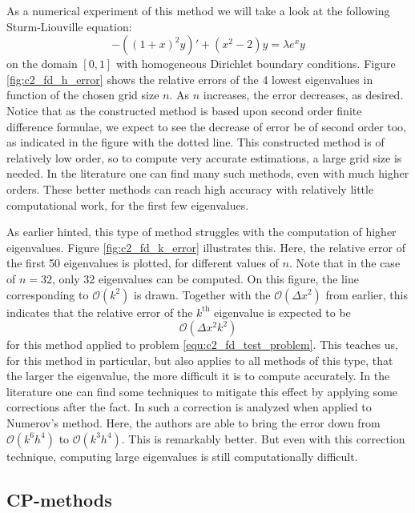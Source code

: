 As a numerical experiment of this method we will take a look at the following Sturm-Liouville equation:
\begin{equation}\label{equ:c2_fd_test_problem}
    -\left((1+x)^2 y \right)' + (x^2 - 2) y = \lambda e^x y
\end{equation}
on the domain $[0, 1]$ with homogeneous Dirichlet boundary conditions. Figure \ref{fig:c2_fd_h_error} shows the relative errors of the 4 lowest eigenvalues in function of the chosen grid size $n$. As $n$ increases, the error decreases, as desired. Notice that as the constructed method is based upon second order finite difference formulae, we expect to see the decrease of error be of second order too, as indicated in the figure with the dotted line. This constructed method is of relatively low order, so to compute very accurate estimations, a large grid size is needed. In the literature one can find many such methods, even with much higher orders. These better methods can reach high accuracy with relatively little computational work, for the first few eigenvalues.

As earlier hinted, this type of method struggles with the computation of higher eigenvalues. Figure \ref{fig:c2_fd_k_error} illustrates this. Here, the relative error of the first 50 eigenvalues is plotted, for different values of $n$. Note that in the case of $n = 32$, only $32$ eigenvalues can be computed. On this figure, the line corresponding to $\mathcal{O}(k^2)$ is drawn. Together with the $\mathcal{O}(\Delta x^2)$ from earlier, this indicates that the relative error of the $k^\text{th}$ eigenvalue is expected to be
$$
    \mathcal{O}(\Delta x^2 k^2)
$$
for this method applied to problem \eqref{equ:c2_fd_test_problem}. This teaches us, for this method in particular, but also applies to all methods of this type, that the larger the eigenvalue, the more difficult it is to compute accurately. In the literature one can find some techniques to mitigate this effect by applying some corrections after the fact. In \cite{andrew_correction_1985} such a correction is analyzed when applied to Numerov's method. Here, the authors are able to bring the error down from $\mathcal{O}(k^6 h^4)$ to $\mathcal{O}(k^3 h^4)$. This is remarkably better. But even with this correction technique, computing large eigenvalues is still computationally difficult.

\subsection{CP-methods}

